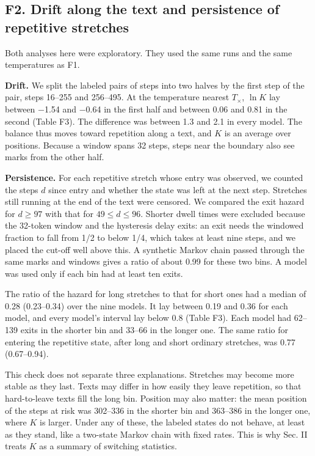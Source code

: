 \documentclass[aps,prx,onecolumn,superscriptaddress,longbibliography]{revtex4-2}
\begin{document}
\subsection*{F2. Drift along the text and persistence of repetitive stretches}

Both analyses here were exploratory. They used the same runs and the same temperatures as F1.

\textbf{Drift.} We split the labeled pairs of steps into two halves by the first step of the pair, steps 16--255 and 256--495. At the temperature nearest \(T_{\times}\), \(\ln K\) lay between −1.54 and −0.64 in the first half and between 0.06 and 0.81 in the second (Table F3). The difference was between 1.3 and 2.1 in every model. The balance thus moves toward repetition along a text, and \(K\) is an average over positions. Because a window spans 32 steps, steps near the boundary also see marks from the other half.

\textbf{Persistence.} For each repetitive stretch whose entry was observed, we counted the steps \(d\) since entry and whether the state was left at the next step. Stretches still running at the end of the text were censored. We compared the exit hazard for \(d\ge 97\) with that for \(49\le d\le 96\). Shorter dwell times were excluded because the 32-token window and the hysteresis delay exits: an exit needs the windowed fraction to fall from 1/2 to below 1/4, which takes at least nine steps, and we placed the cut-off well above this. A synthetic Markov chain passed through the same marks and windows gives a ratio of about 0.99 for these two bins. A model was used only if each bin had at least ten exits.

The ratio of the hazard for long stretches to that for short ones had a median of 0.28 (0.23--0.34) over the nine models. It lay between 0.19 and 0.36 for each model, and every model's interval lay below 0.8 (Table F3). Each model had 62--139 exits in the shorter bin and 33--66 in the longer one. The same ratio for entering the repetitive state, after long and short ordinary stretches, was 0.77 (0.67--0.94).

This check does not separate three explanations. Stretches may become more stable as they last. Texts may differ in how easily they leave repetition, so that hard-to-leave texts fill the long bin. Position may also matter: the mean position of the steps at risk was 302--336 in the shorter bin and 363--386 in the longer one, where \(K\) is larger. Under any of these, the labeled states do not behave, at least as they stand, like a two-state Markov chain with fixed rates. This is why Sec. II treats \(K\) as a summary of switching statistics.
\end{document}

